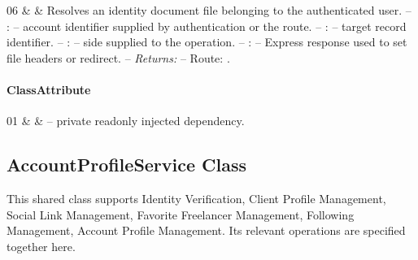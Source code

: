 \begin{ClassMethodTable}
06 & \newline{}\newline{}\newline{}\newline{} &
Resolves an identity document file belonging to the authenticated user.
\newline -- :  -- account identifier supplied by authentication or the route.
\newline -- :  -- target record identifier.
\newline -- :  -- side supplied to the operation.
\newline -- :  -- Express response used to set file headers or redirect.
\newline -- \textit{Returns:} 
\newline -- Route: .
 \\ \hline

\end{ClassMethodTable}

\paragraph{ClassAttribute}
\begin{ClassAttributeTable}
01 &  &  -- private readonly injected dependency. \\ \hline
\end{ClassAttributeTable}

\subsection{AccountProfileService Class}
\label{cls:nhuy-AccountProfileService}

This shared class supports Identity Verification, Client Profile Management, Social Link Management, Favorite Freelancer Management, Following Management, Account Profile Management. Its relevant operations are specified together here.

